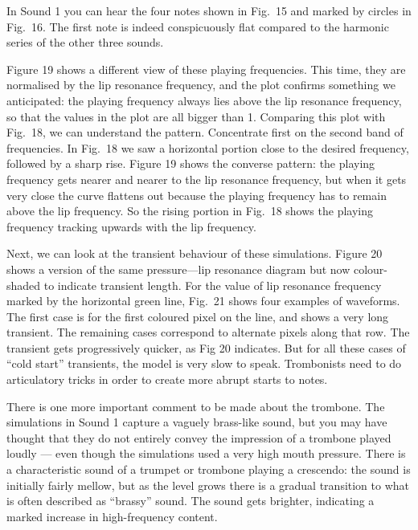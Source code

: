   In Sound 1 you can hear the four notes shown in Fig.\ 15 and marked by 
  circles in Fig.\ 16. The first note is indeed conspicuously flat compared to 
  the harmonic series of the other three sounds. 

  Figure 19 shows a different view of these playing frequencies. This time, 
  they are normalised by the lip resonance frequency, and the plot confirms 
  something we anticipated: the playing frequency always lies above the lip 
  resonance frequency, so that the values in the plot are all bigger than 1. 
  Comparing this plot with Fig.\ 18, we can understand the pattern. Concentrate 
  first on the second band of frequencies. In Fig.\ 18 we saw a horizontal 
  portion close to the desired frequency, followed by a sharp rise. Figure 19 
  shows the converse pattern: the playing frequency gets nearer and nearer to 
  the lip resonance frequency, but when it gets very close the curve flattens 
  out because the playing frequency has to remain above the lip frequency. So 
  the rising portion in Fig.\ 18 shows the playing frequency tracking upwards 
  with the lip frequency. 


  Next, we can look at the transient behaviour of these simulations. Figure 20 
  shows a version of the same pressure—lip resonance diagram but now 
  colour-shaded to indicate transient length. For the value of lip resonance 
  frequency marked by the horizontal green line, Fig.\ 21 shows four examples 
  of waveforms. The first case is for the first coloured pixel on the line, and 
  shows a very long transient. The remaining cases correspond to alternate 
  pixels along that row. The transient gets progressively quicker, as Fig 20 
  indicates. But for all these cases of “cold start” transients, the model is 
  very slow to speak. Trombonists need to do articulatory tricks in order to 
  create more abrupt starts to notes. 


  There is one more important comment to be made about the trombone. The 
  simulations in Sound 1 capture a vaguely brass-like sound, but you may have 
  thought that they do not entirely convey the impression of a trombone played 
  loudly — even though the simulations used a very high mouth pressure. There 
  is a characteristic sound of a trumpet or trombone playing a crescendo: the 
  sound is initially fairly mellow, but as the level grows there is a gradual 
  transition to what is often described as “brassy” sound. The sound gets 
  brighter, indicating a marked increase in high-frequency content. 


